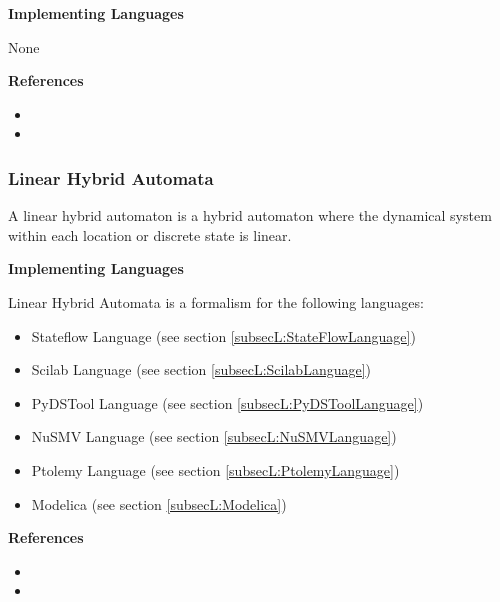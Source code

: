 \textbf{Implementing Languages}

None





\textbf{References}
\begin{itemize}
	
\item {}
	
\item {}
\end{itemize}



\subsubsection{Linear Hybrid Automata}
\label{subsecF:HybridAutomataLinear}


A linear hybrid automaton is a hybrid automaton where the dynamical system within each location or discrete state is linear.

\textbf{Implementing Languages}

Linear Hybrid Automata is a formalism for the following languages:
\begin{itemize}
	\item Stateflow Language (see section \ref{subsecL:StateFlowLanguage})
	\item Scilab Language (see section \ref{subsecL:ScilabLanguage})
	\item PyDSTool Language (see section \ref{subsecL:PyDSToolLanguage})
	\item NuSMV Language (see section \ref{subsecL:NuSMVLanguage})
	\item Ptolemy Language (see section \ref{subsecL:PtolemyLanguage})
	\item Modelica (see section \ref{subsecL:Modelica})
\end{itemize}





\textbf{References}
\begin{itemize}
	
\item {}
	
\item {}
\end{itemize}



